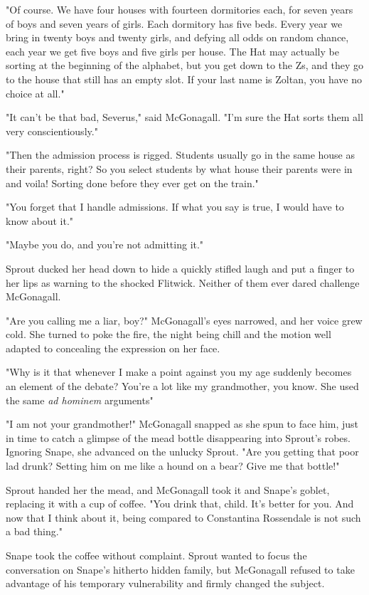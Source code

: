 "Of course. We have four houses with fourteen dormitories each, for seven years of boys and seven years of girls. Each dormitory has five beds. Every year we bring in twenty boys and twenty girls, and defying all odds on random chance, each year we get five boys and five girls per house. The Hat may actually be sorting at the beginning of the alphabet, but you get down to the Zs, and they go to the house that still has an empty slot. If your last name is Zoltan, you have no choice at all."

"It can't be that bad, Severus," said McGonagall. "I'm sure the Hat sorts them all very conscientiously."

"Then the admission process is rigged. Students usually go in the same house as their parents, right? So you select students by what house their parents were in and voila! Sorting done before they ever get on the train."

"You forget that I handle admissions. If what you say is true, I would have to know about it."

"Maybe you do, and you're not admitting it."

Sprout ducked her head down to hide a quickly stifled laugh and put a finger to her lips as warning to the shocked Flitwick. Neither of them ever dared challenge McGonagall.

"Are you calling me a liar, boy?" McGonagall's eyes narrowed, and her voice grew cold. She turned to poke the fire, the night being chill and the motion well adapted to concealing the expression on her face.

"Why is it that whenever I make a point against you my age suddenly becomes an element of the debate? You're a lot like my grandmother, you know. She used the same \emph{ad hominem} arguments{\el}"

"I am not your grandmother!" McGonagall snapped as she spun to face him, just in time to catch a glimpse of the mead bottle disappearing into Sprout's robes. Ignoring Snape, she advanced on the unlucky Sprout. "Are you getting that poor lad drunk? Setting him on me like a hound on a bear? Give me that bottle!"

Sprout handed her the mead, and McGonagall took it and Snape's goblet, replacing it with a cup of coffee. "You drink that, child. It's better for you. And now that I think about it, being compared to Constantina Rossendale is not such a bad thing."

Snape took the coffee without complaint. Sprout wanted to focus the conversation on Snape's hitherto hidden family, but McGonagall refused to take advantage of his temporary vulnerability and firmly changed the subject.

